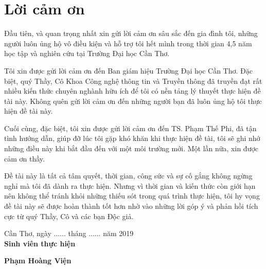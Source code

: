 \chapter*{\Huge Lời cảm ơn}


Đầu tiên, và quan trọng nhất xin gửi lời cảm ơn sâu sắc đến gia đình tôi, những người luôn ủng hộ vô điều kiện và hỗ trợ tôi hết mình trong thời gian 4,5 năm học tập và nghiên cứu tại Trường Đại học Cần Thơ.\par

Tôi xin được gửi lời cảm ơn đến Ban giám hiệu Trường Đại học Cần Thơ. Đặc biệt, quý Thầy, Cô Khoa Công nghệ thông tin và Truyền thông đã truyền đạt rất nhiều kiến thức chuyên nghành hữu ích để tôi có nền tảng lý thuyết thực hiện đề tài này. Không quên gửi lời cảm ơn đến những người bạn đã luôn ủng hộ tôi thực hiện đề tài này.\par

Cuối cùng, đặc biệt, tôi xin được gửi lời cảm ơn đến TS. Phạm Thế Phi, đã tận tình hướng dẫn,  giúp đỡ lúc tôi gặp khó khăn khi thực hiện đề tài, tôi sẽ ghi nhớ những điều này khi bắt đầu đến với một môi trường mới. Một lần nữa, xin được cảm ơn thầy.\par

Đề tài này là tất cả tâm quyết, thời gian, công sức và sự cố gắng không ngừng nghỉ mà tôi đã dành ra thực hiện. Nhưng vì thời gian và kiến thức còn giới hạn nên không thể tránh khỏi những thiếu sót trong quá trình thực hiện, tôi hy vọng đề tài này sẽ được hoàn thành tốt hơn nhờ vào những lời góp ý và phản hồi tích cực từ quý Thầy, Cô và các bạn Độc giả.\par


\vspace{12mm}
\noindent
\begin{flushright}
Cần Thơ, ngày ...... tháng ...... năm 2019 \\
\textbf{Sinh viên thực hiện}
\end{flushright}
\vspace{12mm}
\begin{flushright}
\textbf{Phạm Hoàng Viện}
\end{flushright} 